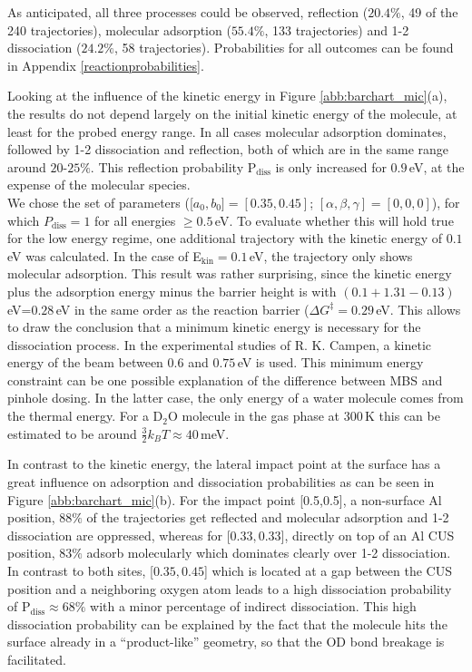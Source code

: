 \documentclass[11pt,DIV=13,BCOR=5mm,a4paper,headinclude]{scrbook}
\begin{document}
As anticipated, all three processes could be observed, reflection ($20.4\%$, 49 of the 240 trajectories), molecular adsorption ($55.4\%$, 133 trajectories) and 1-2 dissociation ($24.2\%$, 58 trajectories).
Probabilities for all outcomes can be found in Appendix \ref{reactionprobabilities}.


Looking at the influence of the kinetic energy in Figure \ref{abb:barchart_mic}(a), the results do not depend largely on the initial kinetic energy of the molecule, at least for the probed energy range.
In all cases molecular adsorption dominates, followed by 1-2 dissociation and reflection, both of which are in the same range around $20$-$25\%$.
This reflection probability P$_\textrm{diss}$ is only increased for $0.9\,$eV, at the expense of the molecular species.\\
We chose the set of parameters ([$a_0,b_0]=[0.35,0.45]$; $[\alpha,\beta,\gamma]=[0,0,0]$), for which $P_\textrm{diss}=1$ for all energies $\geq 0.5\,$eV.
To evaluate whether this will hold true for the low energy regime, one additional trajectory with the kinetic energy of $0.1\,$eV was calculated.
In the case of E$_\textrm{kin}=0.1\,$eV, the trajectory only shows molecular adsorption.
This result was rather surprising, since the kinetic energy plus the adsorption energy minus the barrier height is with $(0.1+1.31-0.13)\,$eV=$0.28\,$eV in the same order as the reaction barrier ($\Delta G^\ddagger=0.29\,$eV\cite{WirthJPCC2012}. %
This allows to draw the conclusion that a minimum kinetic energy is necessary for the dissociation process.
In the experimental studies of R. K. Campen\cite{Heiden11-20_2018}, a kinetic energy of the beam between $0.6$ and $0.75\,$eV is used.
This minimum energy constraint can be one possible explanation of the difference between MBS and pinhole dosing.
In the latter case, the only energy of a water molecule comes from the thermal energy.
For a D$_2$O molecule in the gas phase at $300\,$K this can be estimated to be around $\frac{3}{2}k_BT\approx40\,$meV.


In contrast to the kinetic energy, the lateral impact point at the surface has a great influence on adsorption and dissociation probabilities as can be seen in Figure \ref{abb:barchart_mic}(b).
For the impact point [0.5,0.5], a non-surface Al position, $88\%$ of the trajectories get reflected and molecular adsorption and 1-2 dissociation are oppressed, whereas for [$0.33,0.33$], directly on top of an Al CUS position, $83\%$ adsorb molecularly which dominates clearly over 1-2 dissociation.
In contrast to both sites, [$0.35,0.45$] which is located at a gap between the CUS position and a neighboring oxygen atom leads to a high dissociation probability of P$_\textrm{diss}\approx 68\%$ with a minor percentage of indirect dissociation.
This high dissociation probability can be explained by the fact that the molecule hits the surface already in a ``product-like'' geometry, so that the OD bond breakage is facilitated.
\end{document}
